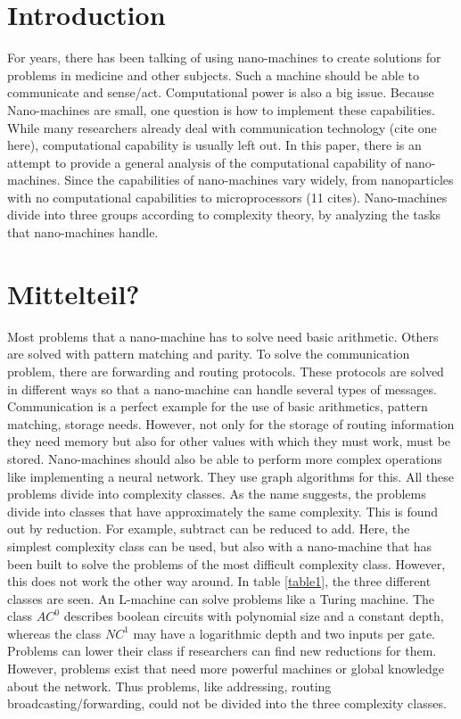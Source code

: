 \documentclass[10pt,sigconf]{acmart}
\begin{document}
\section{Introduction}
For years, there has been talking of using nano-machines to create solutions for problems in medicine and other subjects. Such a machine should be able to communicate and sense/act. Computational power is also a big issue.
Because Nano-machines are small, one question is how to implement these capabilities. 
While many researchers already deal with communication technology (cite one here), computational capability is usually left out.
In this paper, there is an attempt to provide a general analysis of the computational capability of nano-machines.
Since the capabilities of nano-machines vary widely, from nanoparticles with no computational capabilities to microprocessors (11 cites). Nano-machines divide into three groups according to complexity theory,
by analyzing the tasks that nano-machines handle.



\section{Mittelteil?}
Most problems that a nano-machine has to solve need basic arithmetic.
Others are solved with pattern matching and parity.
To solve the communication problem, there are forwarding and routing protocols. 
These protocols are solved in different ways so that a nano-machine can handle several types of messages.
Communication is a perfect example for the use of basic arithmetics, pattern matching, storage needs.
However, not only for the storage of routing information they need memory but also for other values with which they must work, must be stored.
Nano-machines should also be able to perform more complex operations like implementing a neural network.
They use graph algorithms for this. 
All these problems divide into complexity classes.
As the name suggests, the problems divide into classes that have approximately the same complexity.
This is found out by reduction. For example, subtract can be reduced to add. 
Here, the simplest complexity class can be used, but also with a nano-machine that has been built to solve the problems of the most difficult complexity class.
However, this does not work the other way around.
In table \ref{table1}, the three different classes are seen.
An L-machine can solve problems like a Turing machine.
The class $AC^0$ describes boolean circuits with polynomial size and a constant depth, whereas the class $NC^1$ may have a logarithmic depth and two inputs per gate.\\ 
Problems can lower their class if researchers can find new reductions for them. 
However, problems exist that need more powerful machines or global knowledge about the network.
Thus problems, like addressing, routing broadcasting/forwarding, could not be divided into the three complexity classes.
\end{document}
